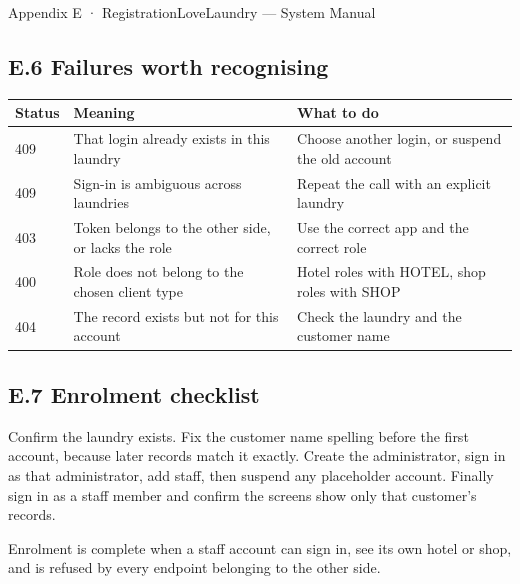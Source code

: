 \documentclass[11pt,a4paper,oneside]{book}
\begin{document}
Appendix E · RegistrationLoveLaundry — System Manual

\subsection*{E.6 Failures worth recognising}
\begin{center}\small
\begin{tabularx}{\linewidth}{|X|X|X|}
\hline
\rowcolor{lightgrey}
\textbf{Status} & \textbf{Meaning} & \textbf{What to do} \\ \hline
409 & That login already exists in this laundry & Choose another login, or suspend the old account \\ \hline
409 & Sign-in is ambiguous across laundries & Repeat the call with an explicit laundry \\ \hline
403 & Token belongs to the other side, or lacks the role & Use the correct app and the correct role \\ \hline
400 & Role does not belong to the chosen client type & Hotel roles with HOTEL, shop roles with SHOP \\ \hline
404 & The record exists but not for this account & Check the laundry and the customer name \\ \hline
\end{tabularx}
\end{center}
\subsection*{E.7 Enrolment checklist}
Confirm the laundry exists. Fix the customer name spelling before the first account, because later records match it exactly. Create the administrator, sign in as that administrator, add staff, then suspend any placeholder account. Finally sign in as a staff member and confirm the screens show only that customer’s records.

Enrolment is complete when a staff account can sign in, see its own hotel or shop, and is refused by every endpoint belonging to the other side.
\end{document}

